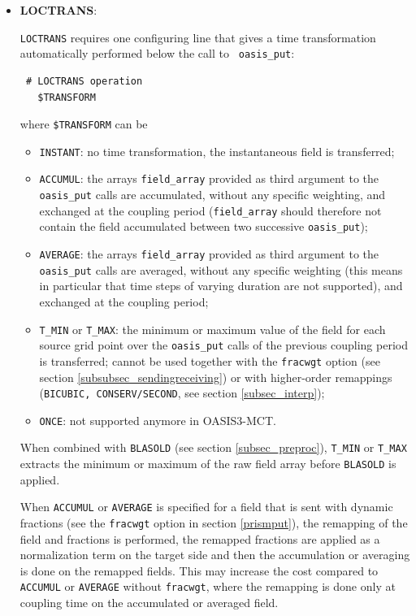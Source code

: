 \begin{itemize}

\item {\bf LOCTRANS}:

  {\tt LOCTRANS} requires one configuring line that gives a time
  transformation automatically performed below the call to {\tt
    oasis\_put}:

  \begin{verbatim}
 # LOCTRANS operation
   $TRANSFORM
\end{verbatim}
  \vspace{-0.2cm} where {\tt \$TRANSFORM} can be
  \begin{itemize}
  \item {\tt INSTANT}: no time transformation, the instantaneous field
    is transferred;
  \item {\tt ACCUMUL}: the arrays {\tt field\_array} provided as third argument to the {\tt oasis\_put} calls  are accumulated, without any specific weighting, and exchanged at the 
    coupling period ({\tt field\_array} should therefore not contain the field accumulated between two successive {\tt oasis\_put});
      \item {\tt AVERAGE}: the arrays {\tt field\_array} provided as third argument to the {\tt oasis\_put} calls  are averaged, without any specific weighting (this means in particular that time steps of varying duration are not supported), and exchanged at the coupling period;
  \item {\tt T\_MIN} or {\tt T\_MAX}: the minimum or maximum value of the field for each source
    grid point over the {\tt oasis\_put} calls of the previous coupling period is transferred; cannot be used together with the {\tt fracwgt} option (see section \ref{subsubsec_sendingreceiving}) or with higher-order remappings ({\tt BICUBIC, CONSERV/SECOND}, see section \ref{subsec_interp});
  \item {\tt ONCE}: not supported anymore in OASIS3-MCT.
  \end{itemize}

When combined with {\tt BLASOLD} (see section \ref{subsec_preproc}), {\tt T\_MIN}  or {\tt T\_MAX}  extracts the minimum or maximum of the raw field array before {\tt BLASOLD}  is applied.

When {\tt ACCUMUL} or {\tt AVERAGE} is specified for a field that is sent with dynamic fractions (see the {\tt fracwgt} option in section \ref{prismput}),
the remapping of the field and fractions is performed, the remapped fractions are applied as a normalization term on the target side and then the accumulation or averaging is done on the remapped fields. This may increase the cost compared to {\tt ACCUMUL}  or {\tt AVERAGE} without {\tt fracwgt}, where the remapping is done only at coupling time on the accumulated or averaged field. 


\end{itemize}
